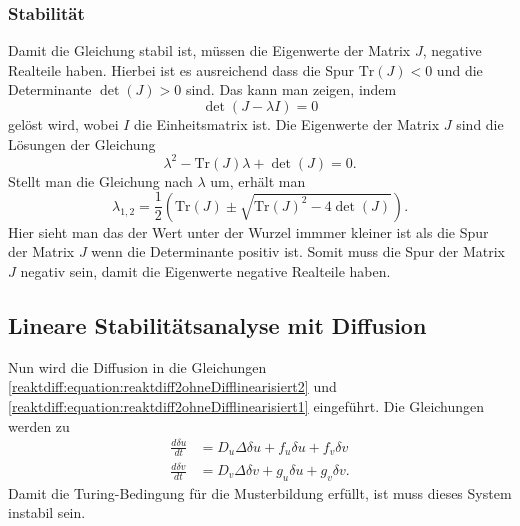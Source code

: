 \subsubsection{Stabilität}
Damit die Gleichung stabil ist, müssen die Eigenwerte der Matrix \(J\), negative Realteile haben.
%
Hierbei ist es ausreichend dass die Spur \(\text{Tr}(J) < 0\) und die Determinante \(\det(J) > 0\) sind.
%
%
Das kann man zeigen, indem
\begin{equation*}
    \det(J - \lambda I) = 0
\end{equation*}
gelöst wird, wobei \(I\) die Einheitsmatrix ist.
Die Eigenwerte der Matrix \(J\) sind die Lösungen der Gleichung
\begin{equation*}
    \lambda^2 - \text{Tr}(J) \lambda + \det(J) = 0.
\label{reaktdiff:equation:reaktdiff2ohneDifflinearisiert3}
\end{equation*}
Stellt man die Gleichung nach \(\lambda\) um, erhält man
\begin{equation*}
    \lambda_{1,2} = \frac{1}{2} \left( \text{Tr}(J) \pm 
    \!\sqrt{\text{Tr}(J)^2 - 4 \det(J)} \right).
\label{reaktdiff:equation:reaktdiff2ohneDifflinearisiert4}
\end{equation*}
Hier sieht man das der Wert unter der Wurzel immmer kleiner ist als die Spur der Matrix \(J\) wenn die Determinante positiv ist.
Somit muss die Spur der Matrix \(J\) negativ sein, damit die Eigenwerte negative Realteile haben.

\subsection{Lineare Stabilitätsanalyse mit Diffusion
\label{reaktdiff:section:matheDiff}}
Nun wird die Diffusion in die Gleichungen \eqref{reaktdiff:equation:reaktdiff2ohneDifflinearisiert2} und \eqref{reaktdiff:equation:reaktdiff2ohneDifflinearisiert1} eingeführt.
Die Gleichungen werden zu
\begin{align}
    \label{reaktdiff:equation:reaktdiff2mitDiff1}
    \frac{d \delta u}{dt} &= D_u \Delta \delta u + 
    f_u \delta u + f_v \delta v\\
    \label{reaktdiff:equation:reaktdiff2mitDiff2}
    \frac{d \delta v}{dt} &= D_v \Delta \delta v + 
    g_u \delta u + g_v \delta v.
\end{align}
Damit die Turing-Bedingung für die Musterbildung erfüllt, ist muss dieses System instabil sein.


